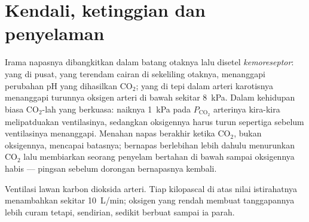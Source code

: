 \section{Kendali, ketinggian dan penyelaman}

\begin{proposition}\label{prop:b1:gas-exchange:control}
Irama napasnya dibangkitkan dalam batang otaknya lalu disetel
\emph{kemoreseptor}: yang di pusat, yang terendam cairan di sekeliling
otaknya, menanggapi perubahan pH yang dihasilkan $\mathrm{CO_2}$; yang
di tepi dalam arteri karotisnya menanggapi turunnya oksigen arteri di
bawah sekitar \qty{8}{kPa}. Dalam kehidupan biasa
$\mathrm{CO_2}$-lah yang berkuasa: naiknya \qty{1}{kPa} pada
$P_{\mathrm{CO_2}}$ arterinya kira-kira melipatduakan ventilasinya,
sedangkan oksigennya harus turun sepertiga sebelum ventilasinya
menanggapi. Menahan napas berakhir ketika $\mathrm{CO_2}$, bukan
oksigennya, mencapai batasnya; bernapas berlebihan lebih dahulu
menurunkan $\mathrm{CO_2}$ lalu membiarkan seorang penyelam bertahan di
bawah sampai oksigennya habis --- pingsan sebelum dorongan bernapasnya
kembali.
\end{proposition}

\begin{omfigure}

{\small Ventilasi lawan karbon dioksida arteri. Tiap kilopascal di
atas nilai istirahatnya menambahkan sekitar \qty{10}{L/min}; oksigen
yang rendah membuat tanggapannya lebih curam tetapi, sendirian, sedikit
berbuat sampai ia parah.}
\end{omfigure}

